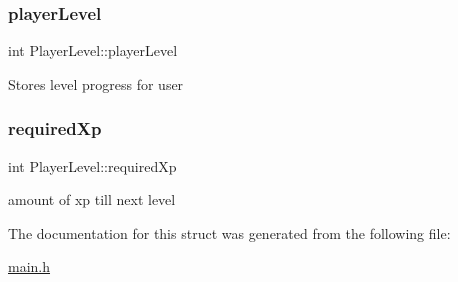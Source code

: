 \subsubsection{\texorpdfstring{player\+Level}{playerLevel}}
{\footnotesize\ttfamily int Player\+Level\+::player\+Level}

Stores level progress for user \mbox{\label{struct_player_level_aca49ddf51125224bb80fd9f9dbef376b}} 
\subsubsection{\texorpdfstring{required\+Xp}{requiredXp}}
{\footnotesize\ttfamily int Player\+Level\+::required\+Xp}

amount of xp till next level 

The documentation for this struct was generated from the following file\+:\begin{DoxyCompactItemize}
\item 
\hyperlink{main_8h}{main.\+h}\end{DoxyCompactItemize}
